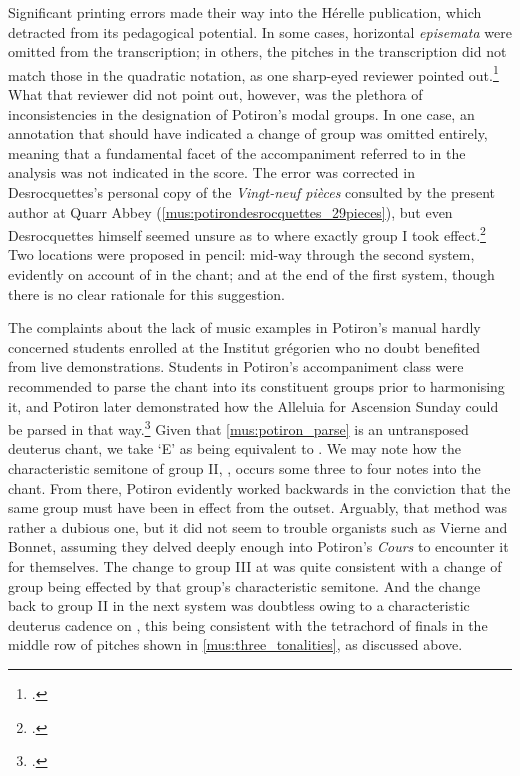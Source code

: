 Significant printing errors made their way into the Hérelle publication, which detracted from its pedagogical potential.
In some cases, horizontal \emph{episemata} were omitted from the transcription; in others, the pitches in the transcription did not match those in the quadratic notation, as one sharp-eyed reviewer pointed out.\footcite[227]{G.ReviewVingtneufpieces1930}
What that reviewer did not point out, however, was the plethora of inconsistencies in the designation of Potiron's modal groups.
In one case, an annotation that should have indicated a change of group was omitted entirely, meaning that a fundamental facet of the accompaniment referred to in the analysis was not indicated in the score.
The error was corrected in Desrocquettes's personal copy of the \emph{Vingt-neuf pièces} consulted by the present author at Quarr Abbey (\cref{mus:potirondesrocquettes_29pieces}), but even Desrocquettes himself seemed unsure as to where exactly group I took effect.\footcite[part~I p.~34, part~II pp.~67--73]{DesrocquettesVingtneufpiecesgregoriennes1929}
Two locations were proposed in pencil: mid-way through the second system, evidently on account of \kern 1pt\natural{} in the chant; and at the end of the first system, though there is no clear rationale for this suggestion.

The complaints about the lack of music examples in Potiron's manual hardly concerned students enrolled at the Institut grégorien who no doubt benefited from live demonstrations.
Students in Potiron's accompaniment class were recommended to parse the chant into its constituent groups prior to harmonising it, and Potiron later demonstrated how the Alleluia for Ascension Sunday could be parsed in that way.\footcite[111]{PotironTreatiseAccompanimentGregorian1933}
Given that \cref{mus:potiron_parse} is an untransposed deuterus chant, we take `E' as being equivalent to .
We may note how the characteristic semitone of group II,  \rightarrow{} , occurs some three to four notes into the chant.
From there, Potiron evidently worked backwards in the conviction that the same group must have been in effect from the outset.
Arguably, that method was rather a dubious one, but it did not seem to trouble organists such as Vierne and Bonnet, assuming they delved deeply enough into Potiron's \emph{Cours} to encounter it for themselves.
The change to group III at  \rightarrow{} \kern 1pt\flat{} was quite consistent with a change of group being effected by that group's characteristic semitone.
And the change back to group II in the next system was doubtless owing to a characteristic deuterus cadence on , this being consistent with the tetrachord of finals in the middle row of pitches shown in \cref{mus:three_tonalities}, as discussed above.

